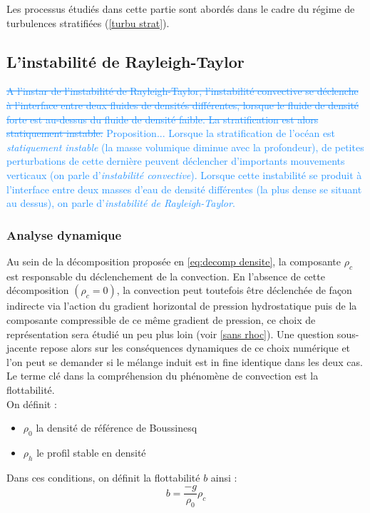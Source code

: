 \documentclass{rapportECC}
\newcommand{\FAadd}[1]{\textcolor{DodgerBlue}{{#1}}}                     %
\newcommand{\FAdel}[1]{\textcolor{DodgerBlue}{\sout{#1}}}                %
\begin{document}
Les processus étudiés dans cette partie sont abordés dans le cadre du régime de turbulences stratifiées (\ref{turbu strat}).
\subsection{L'instabilité de Rayleigh-Taylor}
\label{RT}
\FAdel{A l'instar de l'instabilité de Rayleigh-Taylor, l'instabilité convective se déclenche à l'interface entre deux fluides de densités différentes, lorsque le fluide de densité forte est au-dessus du fluide de densité faible. La stratification est alors statiquement instable.}
\FAadd{Proposition... Lorsque la stratification de l'océan est \textit{statiquement instable} (la masse volumique diminue avec la profondeur), de petites perturbations de cette dernière peuvent déclencher d'importants mouvements verticaux (on parle d'\textit{instabilité convective}). Lorsque cette instabilité se produit à l'interface entre deux masses d'eau de densité différentes (la plus dense se situant au dessus), on parle d'\textit{instabilité de Rayleigh-Taylor}.}\\ 


\subsubsection{Analyse dynamique}


Au sein de la décomposition proposée en \eqref{eq:decomp densite}, la composante $\rho_c$ est responsable du déclenchement de la convection. 
En l'absence de cette décomposition $(\rho_c=0)$, la convection peut toutefois être déclenchée de façon indirecte via l'action du gradient horizontal de pression hydrostatique puis de la composante compressible de ce même gradient de pression, ce choix de représentation sera étudié un peu plus loin (voir \ref{sans rhoc}). Une question sous-jacente repose alors sur les conséquences dynamiques de ce choix numérique et l'on peut se demander si le mélange induit est in fine identique dans les deux cas.\\


\vspace{0.5 cm}
Le terme clé dans la compréhension du phénomène de convection est la flottabilité. \\
On définit :
\begin{itemize}
    \item $\rho_0$ la densité de référence de Boussinesq
    \item $\rho_h$ le profil stable en densité
\end{itemize}
Dans ces conditions, on définit la flottabilité $b$ ainsi :
\begin{equation}
    b = \dfrac{-g}{\rho_0}\rho_c
\end{equation}
\end{document}
